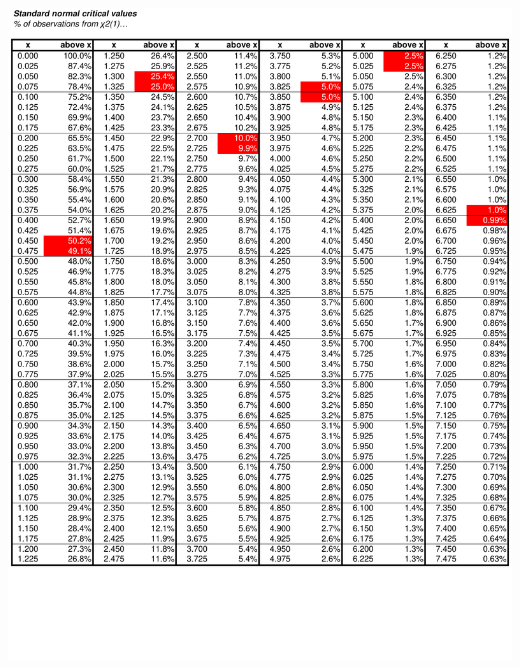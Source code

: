 \documentclass[8pt,letterpaper, landscape]{extarticle} %
\begin{document}
\begin{center}
\includegraphics[height=9.75in, angle=90]{cv3}

\end{center}
\end{document}
